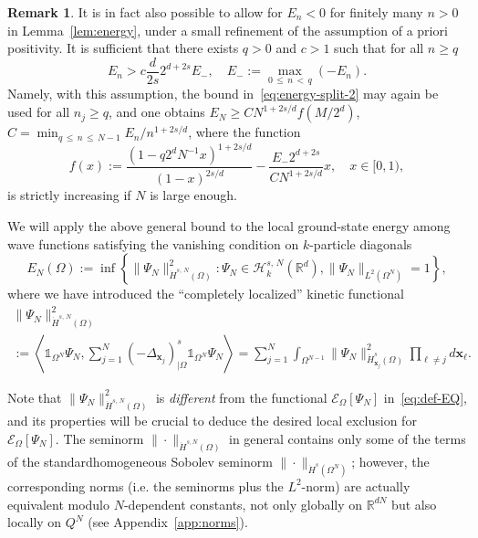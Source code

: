 \documentclass[10pt]{amsart}
\theoremstyle{definition}\newtheorem{defi}[theo]{Definition}\newtheorem{rema}[theo]{Remark}\newtheorem{exam}[theo]{Example}\newtheorem{exem}[theo]{Example}\newtheorem{nota}[theo]{Notation}
\newcommand*\R {\mathbb{R}}
\newcommand\1{{\ensuremath {\mathds 1} }}
\newcommand{\bx}{\mathbf{x}}
\newcommand{\cH}{\mathcal{H}}
\newcommand{\cE}{\mathcal{E}}
\begin{document}
\begin{rema}
It is in fact also possible to allow for $E_n < 0$ for finitely many $n>0$ in Lemma~\ref{lem:energy}, under a small refinement of the assumption of a priori positivity. It is sufficient that there exists $q > 0$ and $c > 1$ such that for all $n \ge q$
\begin{equation}\label{eq:energy-positivity-refined}
E_n > c \frac{d}{2s} 2^{d+2s} E_-,
\quad E_- := \max_{0\,\le\,n\,<\,q} (-E_n).
\end{equation}
Namely, with this assumption, the bound in~\eqref{eq:energy-split-2} may again be used for all $n_j \ge q$, and one obtains $E_N \ge C N^{1+2s/d} f(M/2^d)$, $C = \min_{q\,\le\,n\,\le\,N-1} E_n/n^{1+2s/d}$, where the function
\[
f(x) := \frac{(1-q2^d N^{-1} x)^{1+2s/d}}{(1-x)^{2s/d}} - \frac{E_- 2^{d+2s}}{C N^{1+2s/d}} x,
\quad x \in [0,1),
\]
is strictly increasing if $N$ is large enough.
\end{rema}

We will apply the above general bound to the local ground-state energy among wave functions satisfying the vanishing condition on $k$-particle diagonals
\begin{equation}\label{eq:def-EnQ}
E_N(\Omega) := \inf \left\{ \|\Psi_N\|_{\dot H^{s,\,N}(\Omega)}^2 : \Psi_N \in \cH^{s,\,N}_k(\R^d), \| \Psi_N\|_{L^2\left(\Omega^N\right)}=1 \right\},
\end{equation}
where we have introduced the ``completely localized'' kinetic functional
\begin{multline}\label{eq:def-local-kinetic}
\|\Psi_N\|_{\dot H^{s,\,N}(\Omega)}^2\\
:= \left\langle \1_{\Omega^N} \Psi_N, \sum_{j=1}^N (-\Delta_{\bx_j})^s_{|\Omega} \1_{\Omega^N} \Psi_N \right\rangle= \sum_{j=1}^N \int_{\Omega^{N-1}} \|\Psi_N\|_{\dot H^{s}_{\bx_j}(\Omega)}^2 \prod_{\ell \ne j} d \bx_\ell.
\end{multline}

Note that $\|\Psi_N\|_{\dot H^{s,\,N}(\Omega)}^2$ is \emph{different} from the functional $\cE_{\Omega}[\Psi_N]$ in~\eqref{eq:def-EQ}, and its properties will be crucial to deduce the desired local exclusion for $\cE_{\Omega}[\Psi_N]$. The seminorm $\|\cdot\|_{\dot H^{s,N}(\Omega)}$ in general contains only some of the terms of the standard\linebreak homogeneous Sobolev seminorm $\|\cdot\|_{\dot H^{s}(\Omega^N)}$; however, the corresponding norms (i.e. the seminorms plus the $L^2$-norm) are actually equivalent modulo $N$-dependent constants, not only globally on $\R^{dN}$ but also locally on $Q^N$ (see Appendix~\ref{app:norms}).
\end{document}
